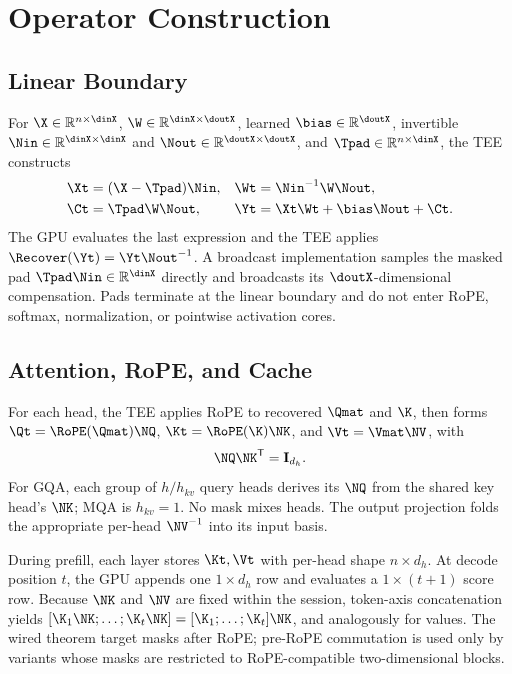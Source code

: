 \section{Operator Construction}
\label{app:operators}

\subsection{Linear Boundary}

For $\X\in\mathbb{R}^{n\times\dinX}$,
$\W\in\mathbb{R}^{\dinX\times\doutX}$, learned
$\bias\in\mathbb{R}^{\doutX}$, invertible
$\Nin\in\mathbb{R}^{\dinX\times\dinX}$ and
$\Nout\in\mathbb{R}^{\doutX\times\doutX}$, and
$\Tpad\in\mathbb{R}^{n\times\dinX}$, the TEE constructs
\begin{align}
\Xt&=(\X-\Tpad)\Nin, &
\Wt&=\Nin^{-1}\W\Nout,\\
\Ct&=\Tpad\W\Nout, &
\Yt&=\Xt\Wt+\bias\Nout+\Ct.
\label{eq:app-linear}
\end{align}
The GPU evaluates the last expression and the TEE applies
$\Recover(\Yt)=\Yt\Nout^{-1}$. A broadcast implementation samples the masked
pad $\Tpad\Nin\in\mathbb{R}^{\dinX}$ directly and broadcasts its
$\doutX$-dimensional compensation. Pads terminate at the linear boundary and
do not enter RoPE, softmax, normalization, or pointwise activation cores.

\subsection{Attention, RoPE, and Cache}

For each head, the TEE applies RoPE to recovered $\Qmat$ and $\K$, then forms
$\Qt=\RoPE(\Qmat)\NQ$, $\Kt=\RoPE(\K)\NK$, and
$\Vt=\Vmat\NV$, with
\begin{equation}
\NQ\NK^{\mathsf T}=\mathbf I_{d_h}.
\label{eq:app-attention-compat}
\end{equation}
For GQA, each group of $h/h_{kv}$ query heads derives its $\NQ$ from the
shared key head's $\NK$; MQA is $h_{kv}=1$. No mask mixes heads. The output
projection folds the appropriate per-head $\NV^{-1}$ into its input basis.

During prefill, each layer stores $\Kt,\Vt$ with per-head shape
$n\times d_h$. At decode position $t$, the GPU appends one
$1\times d_h$ row and evaluates a $1\times(t+1)$ score row. Because $\NK$ and
$\NV$ are fixed within the session, token-axis concatenation yields
$[\K_1\NK;\ldots;\K_t\NK]=[\K_1;\ldots;\K_t]\NK$, and analogously for
values. The wired theorem target masks after RoPE; pre-RoPE commutation is used
only by variants whose masks are restricted to RoPE-compatible two-dimensional
blocks.

